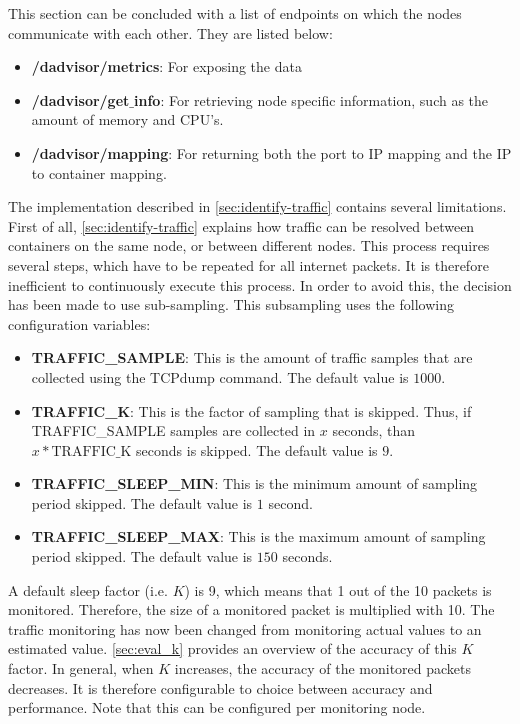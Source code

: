 \noindent
This section can be concluded with a list of endpoints on which the nodes communicate with each other. They are listed below:
\begin{itemize}
    \item \textbf{/dadvisor/metrics}: For exposing the data
    \item \textbf{/dadvisor/get$\_$info}: For retrieving node specific information, such as the amount of memory and CPU's.
    \item \textbf{/dadvisor/mapping}: For returning both the port to IP mapping and the IP to container mapping.
\end{itemize}

\noindent
The implementation described in \autoref{sec:identify-traffic} contains several limitations. First of all, \autoref{sec:identify-traffic} explains how traffic can be resolved between containers on the same node, or between different nodes. This process requires several steps, which have to be repeated for all internet packets. It is therefore inefficient to continuously execute this process. In order to avoid this, the decision has been made to use sub-sampling. This subsampling uses the following configuration variables:

\begin{itemize}
    \item \textbf{TRAFFIC\_SAMPLE}: This is the amount of traffic samples that are collected using the TCPdump command. The default value is $1000$.
    \item \textbf{TRAFFIC\_K}: This is the factor of sampling that is skipped. Thus, if TRAFFIC\_SAMPLE samples are collected in $x$ seconds, than $x * \text{TRAFFIC\_K}$ seconds is skipped. The default value is $9$.
    \item \textbf{TRAFFIC\_SLEEP\_MIN}: This is the minimum amount of sampling period skipped. The default value is $1$ second.
    \item \textbf{TRAFFIC\_SLEEP\_MAX}: This is the maximum amount of sampling period skipped. The default value is $150$ seconds.
\end{itemize}

\noindent
A default sleep factor (i.e. $K$) is 9, which means that 1 out of the 10 packets is monitored. Therefore, the size of a monitored packet is multiplied with 10. The traffic monitoring has now been changed from monitoring actual values to an estimated value. \autoref{sec:eval_k} provides an overview of the accuracy of this $K$ factor. In general, when $K$ increases, the accuracy of the monitored packets decreases. It is therefore configurable to choice between accuracy and performance. Note that this can be configured per monitoring node.\\

